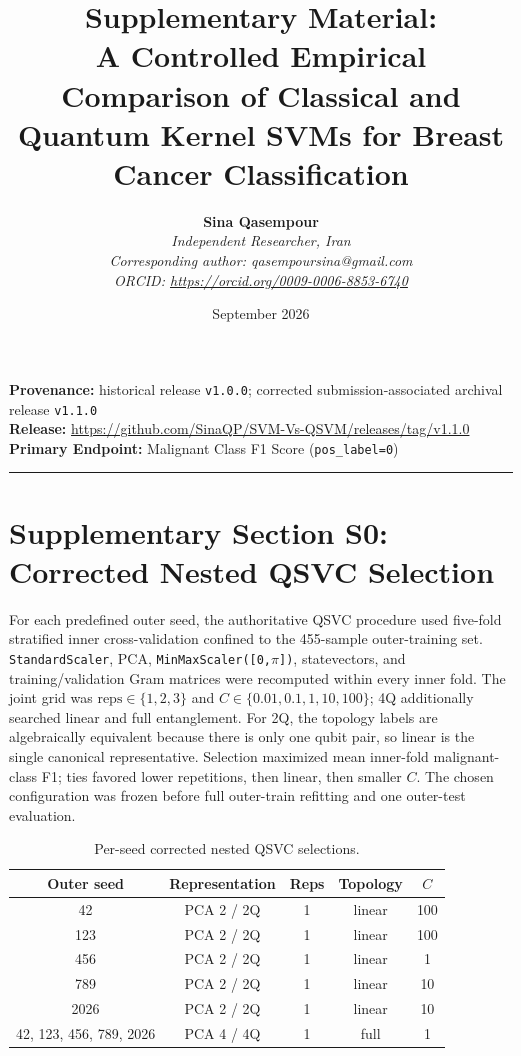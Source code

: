 \documentclass[12pt,a4paper]{article}
\title{\textbf{Supplementary Material:\\A Controlled Empirical Comparison of Classical and Quantum Kernel SVMs for Breast Cancer Classification}}
\author{\textbf{Sina Qasempour}\\[1ex]\textit{Independent Researcher, Iran}\\\textit{Corresponding author: qasempoursina@gmail.com}\\\textit{ORCID: \url{https://orcid.org/0009-0006-8853-6740}}}
\date{September 2026}
\begin{document}
\renewcommand{\thetable}{S\arabic{table}}
\renewcommand{\thefigure}{S\arabic{figure}}

\maketitle

\noindent\textbf{Provenance:} historical release \texttt{v1.0.0}; corrected submission-associated archival release \texttt{v1.1.0}\\
\noindent\textbf{Release:} \url{https://github.com/SinaQP/SVM-Vs-QSVM/releases/tag/v1.1.0}\\
\noindent\textbf{Primary Endpoint:} Malignant Class F1 Score (\texttt{pos\_label=0})

\bigskip
\hrule
\bigskip

\section*{Supplementary Section S0: Corrected Nested QSVC Selection}

For each predefined outer seed, the authoritative QSVC procedure used five-fold stratified inner cross-validation confined to the 455-sample outer-training set. \texttt{StandardScaler}, PCA, \texttt{MinMaxScaler([0,$\pi$])}, statevectors, and training/validation Gram matrices were recomputed within every inner fold. The joint grid was $\text{reps}\in\{1,2,3\}$ and $C\in\{0.01,0.1,1,10,100\}$; 4Q additionally searched linear and full entanglement. For 2Q, the topology labels are algebraically equivalent because there is only one qubit pair, so linear is the single canonical representative. Selection maximized mean inner-fold malignant-class F1; ties favored lower repetitions, then linear, then smaller $C$. The chosen configuration was frozen before full outer-train refitting and one outer-test evaluation.

\begin{table}[htbp]
\centering
\caption{Per-seed corrected nested QSVC selections.}
\begin{tabular}{ccccc}
\toprule
Outer seed & Representation & Reps & Topology & $C$ \\
\midrule
42 & PCA 2 / 2Q & 1 & linear & 100 \\
123 & PCA 2 / 2Q & 1 & linear & 100 \\
456 & PCA 2 / 2Q & 1 & linear & 1 \\
789 & PCA 2 / 2Q & 1 & linear & 10 \\
2026 & PCA 2 / 2Q & 1 & linear & 10 \\
42, 123, 456, 789, 2026 & PCA 4 / 4Q & 1 & full & 1 \\
\bottomrule
\end{tabular}
\end{table}
\end{document}
